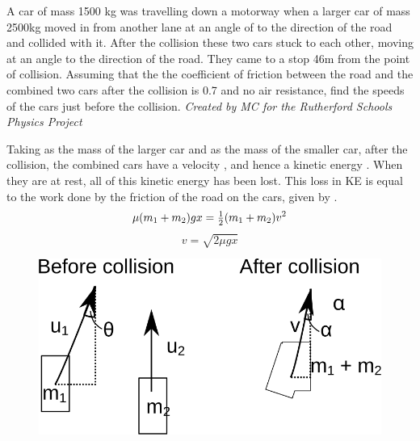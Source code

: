 
\begin{problem} 
{A car of mass 1500 kg was travelling down a motorway when a larger car of mass 2500kg moved in from another lane at an angle of  to the direction of the road and collided with it. After the collision these two cars stuck to each other, moving at an angle  to the direction of the road. They came to a stop 46m from the point of collision. Assuming that the the coefficient of friction between the road and the combined two cars after the collision is 0.7 and no air resistance, find the speeds of the  cars just before the collision.
}
{\textit{Created by MC for the Rutherford Schools Physics Project}}
{Taking  as the mass of the larger car and  as the mass of the smaller car, after the collision, the combined cars have a velocity , and hence a kinetic energy . When they are at rest, all of this kinetic energy has been lost. This loss in KE is equal to the work done by the friction of the road on the cars, given by .
\begin{equation} 
\mu (m_1+m_2)gx = {\textstyle \frac{1}{2}} (m_1+m_2) v^2 
\end{equation}
\begin{equation} 
v = \sqrt{2\mu gx} 
\end{equation}

\begin{figure}[h]
\centering
\includegraphics[width=1.0\textwidth]{../../../figures/dynamics_l6_car_collision.svg}
\caption{}\label{fig:dynamics_l6_car_collision}
\end{figure}


}
\end{problem}
